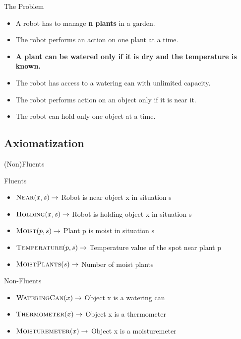 
\begin{frame}{The Problem}
    \vspace*{-0.5cm}
    \begin{itemize}
        \item A robot has to manage \textbf{n plants} in a garden.
        \item The robot performs an action on one plant at a time.
        \item \textbf{A plant can be watered only if it is dry and the temperature is known.}
        \item The robot has access to a watering can with unlimited capacity.
        \item The robot performs action on an object only if it is near it.
        \item The robot can hold only one object at a time.
    \end{itemize}
\end{frame}

\subsection{Axiomatization}

\begin{frame}[fragile]{(Non)Fluents}
    \vspace*{-0.5cm}
    \begin{block}{Fluents}
        \begin{itemize}
            \item $\textsc{Near}(x,s) \rightarrow$ Robot is near object x in situation s
            \item $\textsc{Holding}(x,s) \rightarrow$ Robot is holding object x in situation s
            \item $\textsc{Moist}(p,s) \rightarrow$ Plant p is moist in situation s
            \item $\textsc{Temperature}(p,s) \rightarrow$ Temperature value of the spot near plant p
            \item $\textsc{MoistPlants}(s) \rightarrow$ Number of moist plants
        \end{itemize}
    \end{block}
    \begin{block}{Non-Fluents}
        \begin{itemize}
            \item $\textsc{WateringCan}(x) \rightarrow $ Object x is a watering can
            \item $\textsc{Thermometer}(x) \rightarrow $ Object x is a thermometer
            \item $\textsc{Moisturemeter}(x) \rightarrow $ Object x is a moisturemeter
        \end{itemize}
    \end{block}
\end{frame}


